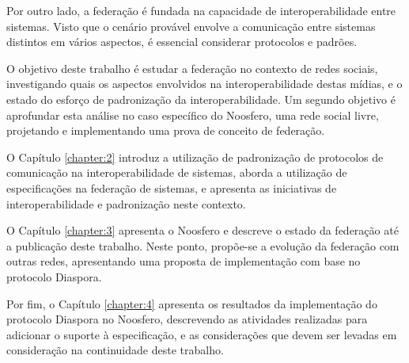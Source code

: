 Por outro lado, a federação é fundada na capacidade de interoperabilidade entre
sistemas. Visto que o cenário provável envolve a comunicação entre sistemas
distintos em vários aspectos, é essencial considerar protocolos e padrões.

O objetivo deste trabalho é estudar a federação no contexto de redes sociais,
investigando quais os aspectos envolvidos na interoperabilidade destas mídias, e o
estado do esforço de padronização da interoperabilidade. Um segundo objetivo é
aprofundar esta análise no caso específico do Noosfero, uma rede social livre,
projetando e implementando uma prova de conceito de federação.

O Capítulo \ref{chapter:2} introduz a utilização de padronização de protocolos
de comunicação na interoperabilidade de sistemas, aborda a utilização de
especificações na federação de sistemas, e apresenta as iniciativas de
interoperabilidade e padronização neste contexto.

O Capítulo \ref{chapter:3} apresenta o Noosfero e descreve o estado da federação
até a publicação deste trabalho. Neste ponto, propõe-se a evolução da federação com
outras redes, apresentando uma proposta de implementação com base no protocolo
Diaspora.

Por fim, o Capítulo \ref{chapter:4} apresenta os resultados da implementação do
protocolo Diaspora no Noosfero, descrevendo as atividades realizadas para adicionar
o suporte à especificação, e as considerações que devem ser levadas em consideração
na continuidade deste trabalho.

